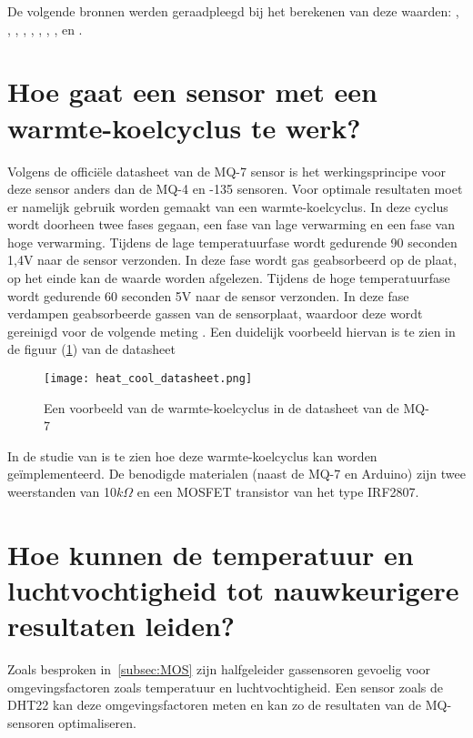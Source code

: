 De volgende bronnen werden geraadpleegd bij het berekenen van deze waarden: \autocite{ohm2024}, \autocite{Cornelius2022}, \autocite{KumarSai2019}, \autocite{Dorcea2018}, \autocite{jaycon2023}, \autocite{Kalra2016}, \autocite{RapidTables}, \autocite{Ibrahim2022}, \autocite{Gironi2014} en \autocite{Gironi2017}.



\section{Hoe gaat een sensor met een warmte-koelcyclus te werk?}%
\label{sec:warmte-koelcyclus}


Volgens de officiële datasheet van de MQ-7 sensor is het werkingsprincipe voor deze sensor anders dan de MQ-4 en -135 sensoren. Voor optimale resultaten moet er namelijk gebruik worden gemaakt van een warmte-koelcyclus. In deze cyclus wordt doorheen twee fases gegaan, een fase van lage verwarming en een fase van hoge verwarming. Tijdens de lage temperatuurfase wordt gedurende 90 seconden 1,4V naar de sensor verzonden. In deze fase wordt gas geabsorbeerd op de plaat, op het einde kan de waarde worden afgelezen. Tijdens de hoge temperatuurfase wordt gedurende 60 seconden 5V naar de sensor verzonden. In deze fase verdampen geabsorbeerde gassen van de sensorplaat, waardoor deze wordt gereinigd voor de volgende meting \autocite{Kobbekaduwa2021}. Een duidelijk voorbeeld hiervan is te zien in de figuur (\ref{fig:heat_cool_datasheet}) van de datasheet

\begin{figure}[h!]
    \texttt{[image: heat\_cool\_datasheet.png]}
    \caption[Warmte-koelcyclus MQ-7]{Een voorbeeld van de warmte-koelcyclus in de datasheet van de MQ-7 \autocite{mq7}}
    \label{fig:heat_cool_datasheet}
\end{figure}

In de studie van \textcite{Kobbekaduwa2021} is te zien hoe deze warmte-koelcyclus kan worden geïmplementeerd. De benodigde materialen (naast de MQ-7 en Arduino) zijn twee weerstanden van 10$k\Omega$ en een MOSFET transistor van het type IRF2807.


\section{Hoe kunnen de temperatuur en luchtvochtigheid tot nauwkeurigere resultaten leiden?}
\label{sec:temp-en-hum}

Zoals besproken in~\ref{subsec:MOS} zijn halfgeleider gassensoren gevoelig voor omgevingsfactoren zoals temperatuur en luchtvochtigheid. Een sensor zoals de DHT22 \autocite{Liu} kan deze omgevingsfactoren meten en kan zo de resultaten van de MQ-sensoren optimaliseren.

